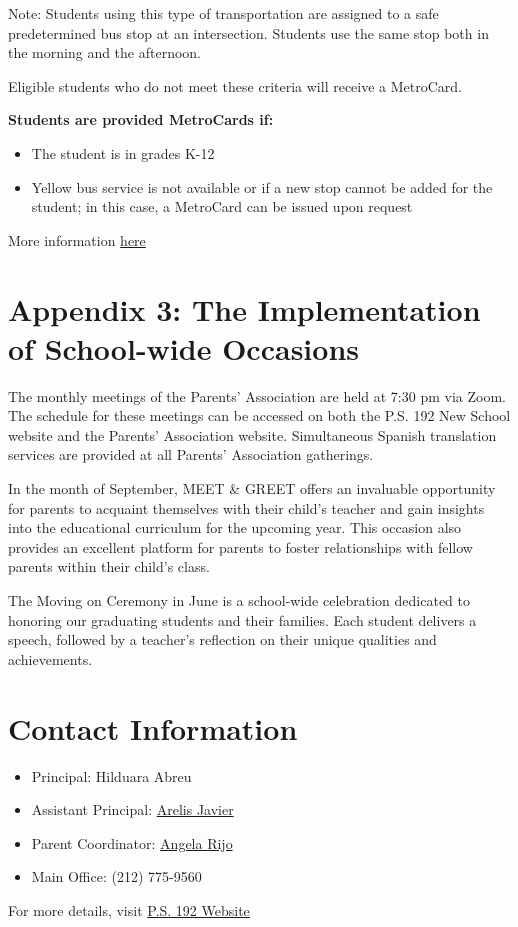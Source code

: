 \documentclass[letterpaper, 11pt]{article}
\begin{document}
Note: Students using this type of transportation are assigned to a safe predetermined bus stop at an intersection. Students use the same stop both in the morning and the afternoon.

Eligible students who do not meet these criteria will receive a MetroCard.

\textbf{\textbf{Students are provided MetroCards if:}}
\begin{itemize}
\item The student is in grades K-12
\item Yellow bus service is not available or if a new stop cannot be added for the student; in this case, a MetroCard can be issued upon request
\end{itemize}

More information \href{https://www.schools.nyc.gov/school-life/transportation/bus-eligibility}{here}

\section{Appendix 3: The Implementation of School-wide Occasions}
\label{sec:orgbea3def}

The monthly meetings of the Parents’ Association are held at 7:30 pm via Zoom. The schedule for these meetings can be accessed on both the P.S. 192 New School website and the Parents’ Association website. Simultaneous Spanish translation services are provided at all Parents’ Association gatherings.

In the month of September, MEET \& GREET offers an invaluable opportunity for parents to acquaint themselves with their child’s teacher and gain insights into the educational curriculum for the upcoming year. This occasion also provides an excellent platform for parents to foster relationships with fellow parents within their child’s class.

The Moving on Ceremony in June is a school-wide celebration dedicated to honoring our graduating students and their families. Each student delivers a speech, followed by a teacher’s reflection on their unique qualities and achievements.

\section{Contact Information}
\label{sec:org343b097}
\begin{itemize}
\item Principal: Hilduara Abreu
\item Assistant Principal: \href{https://ps192.org/arelis}{Arelis Javier}
\item Parent Coordinator: \href{https://www.ps192.org/angela}{Angela Rijo}
\item Main Office: (212) 775-9560
\end{itemize}

For more details, visit \href{https://www.ps192.org}{P.S. 192 Website}
\end{document}
